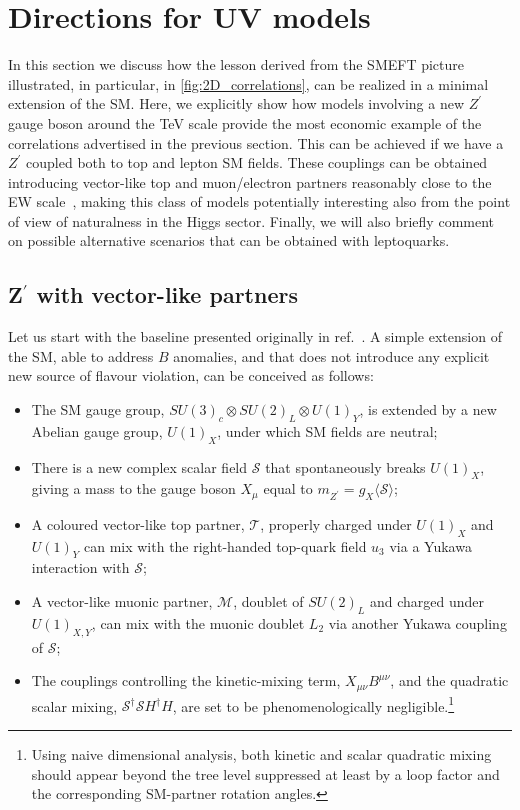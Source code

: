 \section{Directions for UV models}
\label{sec:UVtoymodels}

In this section we discuss how the lesson derived from the SMEFT picture illustrated, in particular, in \autoref{fig:2D_correlations}, can be realized in a minimal extension of the SM. Here, we explicitly show how models involving a new $Z^\prime$ gauge boson around the TeV scale provide the most economic example of the correlations advertised in the previous section. 
This can be achieved if we have a $Z^\prime$ coupled both to top and lepton SM fields.
These couplings can be obtained introducing vector-like top and muon/electron partners reasonably close to the EW scale~\cite{Kamenik:2017tnu,Fox:2018ldq}, making this class of models potentially interesting also from the point of view of naturalness in the Higgs sector.
Finally, we will also briefly comment on possible alternative scenarios that can be obtained with leptoquarks.

\subsection{\texorpdfstring{Z$^{\prime}$}{Z'} with vector-like partners}
\label{sec:mod_Zprime}

Let us start with the baseline presented originally in ref.~\cite{Kamenik:2017tnu}. A simple extension of the SM, able to address $B$ anomalies, and  that does not introduce any explicit new source of flavour violation, can be conceived as follows:
\begin{itemize}
	\item The SM gauge group, $SU(3)_{c} \otimes SU(2)_{L} \otimes U(1)_{Y}$, is extended by a new Abelian gauge group, $U(1)_{X}$, under which SM fields are neutral;
	\item There is a new complex scalar field $\mathcal{S}$ that spontaneously breaks $U(1)_{X}$, giving a mass to the gauge boson $X_{\mu}$ equal to $m_{Z^{\prime}} = g_{X} \langle \mathcal{S} \rangle $;
	\item A coloured vector-like top partner, $\mathcal{T}$, properly charged under $U(1)_{X}$ and $U(1)_{Y}$ can mix with the right-handed top-quark field $u_{3}$ via a Yukawa interaction with $\mathcal{S}$; 
	\item A vector-like muonic partner, $\mathcal{M}$, doublet of $SU(2)_{L}$ and charged under $U(1)_{X,Y}$, can mix with the muonic doublet $L_2$ via another Yukawa coupling of $\mathcal{S}$;
	\item The couplings controlling the kinetic-mixing term, $X_{\mu \nu} B^{\mu \nu}$, and the quadratic scalar mixing, $\mathcal{S}^{\dagger}\mathcal{S} H^{\dagger} H$, are set to be phenomenologically negligible.\footnote{Using naive dimensional analysis, both kinetic and scalar quadratic mixing should appear beyond the tree level suppressed at least by a loop factor and the corresponding SM-partner rotation angles.} 
\end{itemize}


